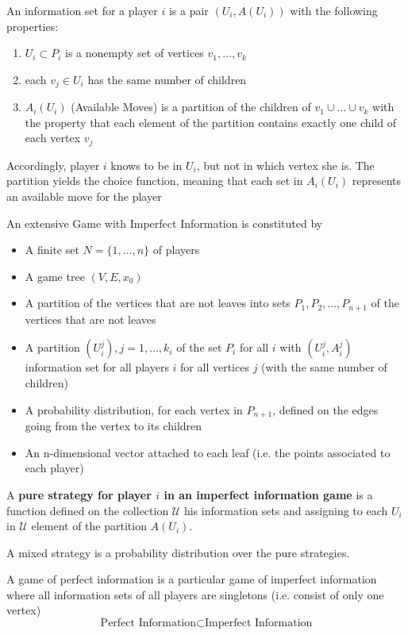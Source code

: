 \documentclass[../main.tex]{subfiles}
\begin{document}
\begin{definition}
    An information set for a player $i$ is a pair $(U_i , A(U_i))$ with the following properties:
    \begin{enumerate}
        \item $U_i \subset P_i$ is a nonempty set of vertices $v_1,\ldots,v_k$
        \item each $v_j \in U_i$ has the same number of children
        \item $A_i(U_i)$ (Available Moves) is a partition of the children of $v_1 \cup \ldots \cup v_k$ with the property that each element of the partition contains exactly one child of each vertex $v_j$
    \end{enumerate}
    Accordingly, player $i$ knows to be in $U_i$, but not in which vertex she is.
    The partition yields the choice function, meaning that each set in $A_i(U_i)$ represents an available move for the player
\end{definition}

\begin{definition}
    An extensive Game with Imperfect Information is constituted by
    \begin{itemize}
        \item A finite set $N = \{1, \ldots, n\}$ of players
        \item A game tree $(V, E, x_0)$
        \item A partition of the vertices that are not leaves into sets $P_1, P_2, \ldots, P_{n+1}$ of the vertices that are not leaves
        \item A partition $(U_i^j), j=1,\ldots,k_i$ of the set $P_i$ for all $i$ with $(U_i^j, A_i^j)$ information set for all players $i$ for all vertices $j$ (with the same number of children)
        \item A probability distribution, for each vertex in $P_{n+1}$, defined on the edges going from the vertex to its children
        \item An n-dimensional vector attached to each leaf (i.e. the points associated to each player)
    \end{itemize}
\end{definition}

\newpage

\begin{definition}
    A \textbf{pure strategy for player $i$ in an imperfect information game} is a function defined on the collection $\mathcal{U}$ his information sets and assigning to each $U_i$ in $\mathcal{U}$ element of the partition $A(U_i)$.

    A mixed strategy is a probability distribution over the pure strategies.
\end{definition}
\begin{remark}
    A game of perfect information is a particular game of imperfect information where all information sets of all players are singletons (i.e. consist of only one vertex)
    \begin{equation*}
        \text{Perfect Information} \subset \text{Imperfect Information}
    \end{equation*}
\end{remark}
\end{document}
